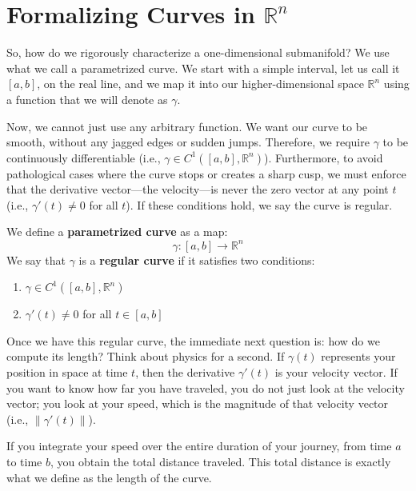 
\section{Formalizing Curves in \texorpdfstring{$\mathbb{R}^n$}{Rn}}

\begin{spoken-clean}[00:03:50 - 00:05:20]
So, how do we rigorously characterize a one-dimensional submanifold? We use what we call a parametrized curve. We start with a simple interval, let us call it $[a, b]$, on the real line, and we map it into our higher-dimensional space $\mathbb{R}^n$ using a function that we will denote as $\gamma$. 

Now, we cannot just use any arbitrary function. We want our curve to be smooth, without any jagged edges or sudden jumps. Therefore, we require $\gamma$ to be continuously differentiable (i.e., $\gamma \in C^1([a, b], \mathbb{R}^n)$). Furthermore, to avoid pathological cases where the curve stops or creates a sharp cusp, we must enforce that the derivative vector—the velocity—is never the zero vector at any point $t$ (i.e., $\gamma'(t) \neq 0$ for all $t$). If these conditions hold, we say the curve is regular.
\end{spoken-clean}

\begin{math-stroke}
We define a \textbf{parametrized curve} as a map:
\[
\gamma: [a, b] \to \mathbb{R}^n
\]
We say that $\gamma$ is a \textbf{regular curve} if it satisfies two conditions:
\begin{enumerate}
    \item $\gamma \in C^1([a, b], \mathbb{R}^n)$ 
    \item $\gamma'(t) \neq 0$ for all $t \in [a, b]$ 
\end{enumerate}
\end{math-stroke}

\begin{spoken-clean}[00:05:20 - 00:07:15]
Once we have this regular curve, the immediate next question is: how do we compute its length? Think about physics for a second. If $\gamma(t)$ represents your position in space at time $t$, then the derivative $\gamma'(t)$ is your velocity vector. If you want to know how far you have traveled, you do not just look at the velocity vector; you look at your speed, which is the magnitude of that velocity vector (i.e., $\|\gamma'(t)\|$).

If you integrate your speed over the entire duration of your journey, from time $a$ to time $b$, you obtain the total distance traveled. This total distance is exactly what we define as the length of the curve.
\end{spoken-clean}

